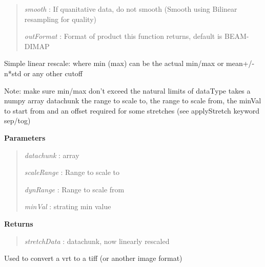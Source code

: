 \documentclass[letterpaper,10pt,openany,oneside]{sphinxmanual}
\begin{document}
\begin{fulllineitems}
\begin{fulllineitems}
\begin{quote}
\emph{smooth} : If quanitative data, do not smooth (Smooth using Bilinear resampling for quality)

\emph{outFormat} : Format of product this function returns, default is BEAM-DIMAP
\end{quote}

\end{fulllineitems}


\begin{fulllineitems}
\label{code:Image.Image.stretchLinear}
Simple linear rescale: where min (max) can be the actual min/max or mean+/- n*std or any other cutoff

Note: make sure min/max don't exceed the natural limits of dataType
takes a numpy array datachunk the range to scale to, the range to scale
from, the minVal to start from and an offset required for some stretches
(see applyStretch keyword sep/tog)

\textbf{Parameters}
\begin{quote}

\emph{datachunk}   : array

\emph{scaleRange}  : Range to scale to

\emph{dynRange}    : Range to scale from

\emph{minVal}      : strating min value
\end{quote}

\textbf{Returns}
\begin{quote}

\emph{stretchData} : datachunk, now linearly rescaled
\end{quote}

\end{fulllineitems}


\begin{fulllineitems}
\label{code:Image.Image.vrt2RealImg}
Used to convert a vrt to a tiff (or another image format)

\end{fulllineitems}


\end{fulllineitems}
\end{document}

